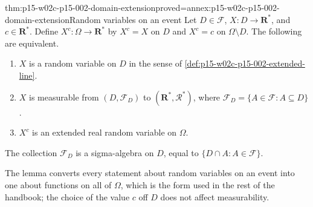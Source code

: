 \begin{hblemma}{thm:p15-w02c-p15-002-domain-extension}{proved=annex:p15-w02c-p15-002-domain-extension}{Random variables on an event}
Let \(D\in\mathcal F\), \(X:D\to\mathbf R^*\), and \(c\in\mathbf R^*\).
Define \(X^c:\Omega\to\mathbf R^*\) by \(X^c=X\) on \(D\) and \(X^c=c\) on
\(\Omega\setminus D\). The following are equivalent.
\begin{enumerate}
\item \(X\) is a random variable on \(D\) in the sense of
      \cref{def:p15-w02c-p15-002-extended-line}.
\item \(X\) is measurable from \((D,\mathcal F_D)\) to
      \((\mathbf R^*,\mathcal R^*)\), where
      \(\mathcal F_D=\{A\in\mathcal F:A\subseteq D\}\).
\item \(X^c\) is an extended real random variable on \(\Omega\).
\end{enumerate}
The collection \(\mathcal F_D\) is a sigma-algebra on \(D\), equal to
\(\{D\cap A:A\in\mathcal F\}\).
\end{hblemma}

The lemma converts every statement about random variables on an event
into one about functions on all of \(\Omega\), which is the form used in
the rest of the handbook; the choice of the value \(c\) off \(D\) does not
affect measurability.


